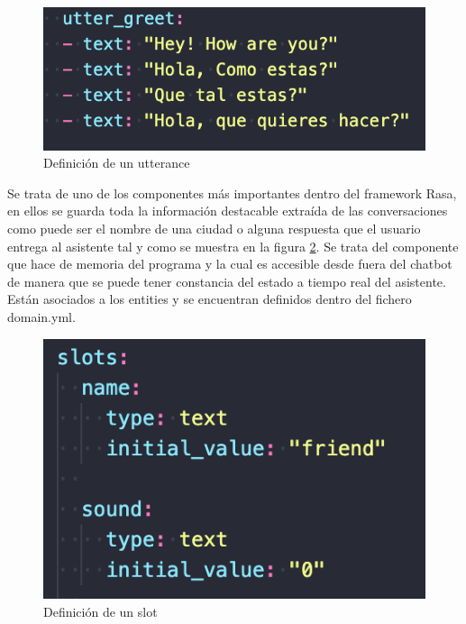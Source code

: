 \begin{figure}[H]
    \centering
    \includegraphics[scale=0.6]{include/capturas/RasaUtterance.png}
    \caption{Definición de un utterance}
    \label{fig:rasa_utterance}
\end{figure}
\vspace{1cm}


Se trata de uno de los componentes más importantes dentro del framework Rasa, en ellos se guarda toda la información destacable extraída de las conversaciones como puede ser el nombre de una ciudad o alguna respuesta que el usuario entrega al asistente tal y como se muestra en la figura \ref{fig:rasa_slot}. Se trata del componente que hace de memoria del programa y la cual es accesible desde fuera del chatbot de manera que se puede tener constancia del estado a tiempo real del asistente. Están asociados a los entities y se encuentran definidos dentro del fichero domain.yml.

\begin{figure}[H]
    \centering
    \includegraphics[scale=0.7]{include/capturas/RasaSlot.png}
    \caption{Definición de un slot}
    \label{fig:rasa_slot}
\end{figure}

